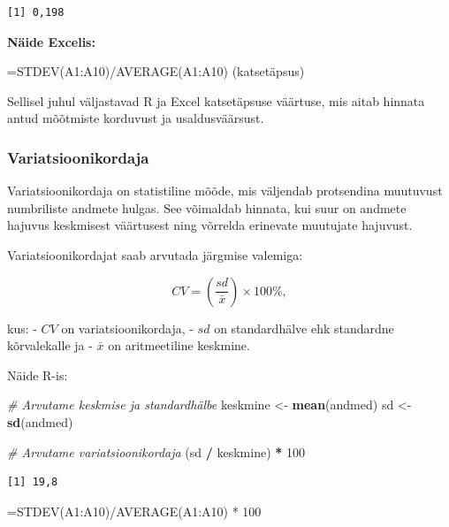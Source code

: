 \documentclass[
]{book}
\newenvironment{Shaded}{\begin{snugshade}}{\end{snugshade}}
\newcommand{\CommentTok}[1]{\textcolor[rgb]{0.56,0.35,0.01}{\textit{#1}}}
\newcommand{\DecValTok}[1]{\textcolor[rgb]{0.00,0.00,0.81}{#1}}
\newcommand{\FunctionTok}[1]{\textcolor[rgb]{0.13,0.29,0.53}{\textbf{#1}}}
\newcommand{\NormalTok}[1]{#1}
\newcommand{\OtherTok}[1]{\textcolor[rgb]{0.56,0.35,0.01}{#1}}
\newcommand{\SpecialCharTok}[1]{\textcolor[rgb]{0.81,0.36,0.00}{\textbf{#1}}}
\renewenvironment{Shaded} {\begin{snugshade}\footnotesize} {\end{snugshade}}
\begin{document}
\begin{verbatim}
[1] 0,198
\end{verbatim}

\textbf{Näide Excelis:}

\begin{Shaded}
\begin{Highlighting}[]
\NormalTok{\textasciigrave{}=STDEV(A1:A10)/AVERAGE(A1:A10)\textasciigrave{} (katsetäpsus)}
\end{Highlighting}
\end{Shaded}

Sellisel juhul väljastavad R ja Excel katsetäpsuse väärtuse, mis aitab hinnata antud mõõtmiste korduvust ja usaldusväärsust.

\subsubsection{Variatsioonikordaja}\label{variatsioonikordaja}

Variatsioonikordaja on statistiline mõõde, mis väljendab protsendina muutuvust numbriliste andmete hulgas. See võimaldab hinnata, kui suur on andmete hajuvus keskmisest väärtusest ning võrrelda erinevate muutujate hajuvust.

Variatsioonikordajat saab arvutada järgmise valemiga:

\[
CV = \left(\frac{sd}{\bar{x}}\right) \times 100\%,
\]

kus:
- \(CV\) on variatsioonikordaja,
- \(sd\) on standardhälve ehk standardne kõrvalekalle ja
- \(\bar{x}\) on aritmeetiline keskmine.

Näide R-is:

\begin{Shaded}
\begin{Highlighting}[]
\CommentTok{\# Arvutame keskmise ja standardhälbe}
\NormalTok{keskmine }\OtherTok{\textless{}{-}} \FunctionTok{mean}\NormalTok{(andmed)}
\NormalTok{sd }\OtherTok{\textless{}{-}} \FunctionTok{sd}\NormalTok{(andmed)}

\CommentTok{\# Arvutame variatsioonikordaja}
\NormalTok{(sd }\SpecialCharTok{/}\NormalTok{ keskmine) }\SpecialCharTok{*} \DecValTok{100}
\end{Highlighting}
\end{Shaded}

\begin{verbatim}
[1] 19,8
\end{verbatim}

=STDEV(A1:A10)/AVERAGE(A1:A10) * 100
\end{document}
